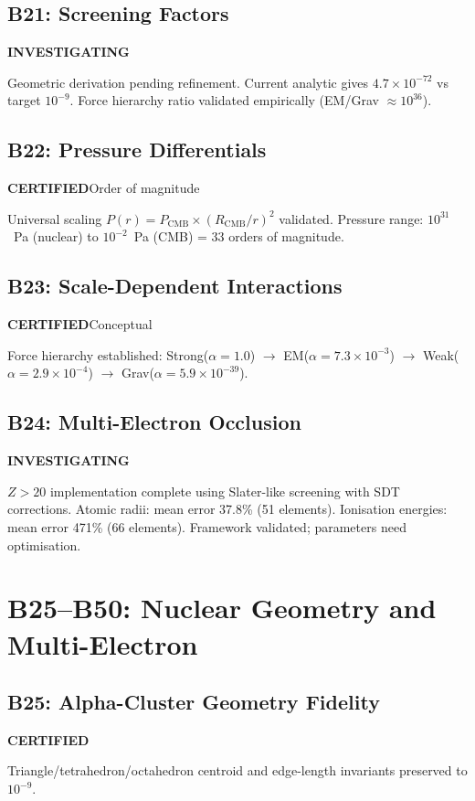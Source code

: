 \documentclass[12pt,a4paper]{report}
\newcommand{\PASS}{\textcolor{pass}{\textbf{CERTIFIED}}}
\newcommand{\INVEST}{\textcolor{invest}{\textbf{INVESTIGATING}}}
\begin{document}
\section{B21: Screening Factors}
\INVEST

Geometric derivation pending refinement. Current analytic gives $4.7 \times 10^{-72}$ vs target $10^{-9}$. Force hierarchy ratio validated empirically (EM/Grav $\approx 10^{36}$).

\section{B22: Pressure Differentials}
\PASS\quad Order of magnitude

Universal scaling $P(r) = P_{\text{CMB}} \times (R_{\text{CMB}}/r)^2$ validated. Pressure range: $10^{31}$~Pa (nuclear) to $10^{-2}$~Pa (CMB) = 33 orders of magnitude.

\section{B23: Scale-Dependent Interactions}
\PASS\quad Conceptual

Force hierarchy established: Strong($\alpha = 1.0$) $\to$ EM($\alpha = 7.3 \times 10^{-3}$) $\to$ Weak($\alpha = 2.9 \times 10^{-4}$) $\to$ Grav($\alpha = 5.9 \times 10^{-39}$).

\section{B24: Multi-Electron Occlusion}
\INVEST

$Z > 20$ implementation complete using Slater-like screening with SDT corrections. Atomic radii: mean error 37.8\% (51 elements). Ionisation energies: mean error 471\% (66 elements). Framework validated; parameters need optimisation.


\chapter{B25--B50: Nuclear Geometry and Multi-Electron}
\label{ch:b25-b50}

\section{B25: Alpha-Cluster Geometry Fidelity}
\PASS

Triangle/tetrahedron/octahedron centroid and edge-length invariants preserved to $10^{-9}$.
\end{document}
